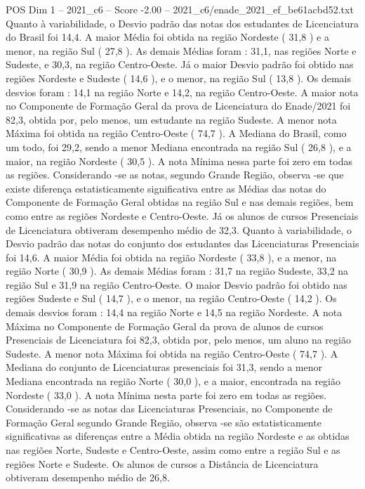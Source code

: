 \begin{textsample}{POS Dim 1 – 2021\_c6 – Score -2.00 – 2021\_c6/enade\_2021\_ef\_be61acbd52.txt}
Quanto à variabilidade, o Desvio padrão das notas dos estudantes de Licenciatura do Brasil foi 14,4.
A maior Média foi obtida na região Nordeste ( 31,8 ) e a menor, na região Sul ( 27,8 ).
As demais Médias foram : 31,1, nas regiões Norte e Sudeste, e 30,3, na região Centro-Oeste.
Já o maior Desvio padrão foi obtido nas regiões Nordeste e Sudeste ( 14,6 ), e o menor, na região Sul ( 13,8 ).
Os demais desvios foram : 14,1 na região Norte e 14,2, na região Centro-Oeste.
A maior nota no Componente de Formação Geral da prova de Licenciatura do Enade/2021 foi 82,3, obtida por, pelo menos, um estudante na região Sudeste.
A menor nota Máxima foi obtida na região Centro-Oeste ( 74,7 ).
A Mediana do Brasil, como um todo, foi 29,2, sendo a menor Mediana encontrada na região Sul ( 26,8 ), e a maior, na região Nordeste ( 30,5 ).
A nota Mínima nessa parte foi zero em todas as regiões.
Considerando -se as notas, segundo Grande Região, observa -se que existe diferença estatisticamente significativa entre as Médias das notas do Componente de Formação Geral obtidas na região Sul e nas demais regiões, bem como entre as regiões Nordeste e Centro-Oeste.
Já os alunos de cursos Presenciais de Licenciatura obtiveram desempenho médio de 32,3.
Quanto à variabilidade, o Desvio padrão das notas do conjunto dos estudantes das Licenciaturas Presenciais foi 14,6.
A maior Média foi obtida na região Nordeste ( 33,8 ), e a menor, na região Norte ( 30,9 ).
As demais Médias foram : 31,7 na região Sudeste, 33,2 na região Sul e 31,9 na região Centro-Oeste.
O maior Desvio padrão foi obtido nas regiões Sudeste e Sul ( 14,7 ), e o menor, na região Centro-Oeste ( 14,2 ).
Os demais desvios foram : 14,4 na região Norte e 14,5 na região Nordeste.
A nota Máxima no Componente de Formação Geral da prova de alunos de cursos Presenciais de Licenciatura foi 82,3, obtida por, pelo menos, um aluno na região Sudeste.
A menor nota Máxima foi obtida na região Centro-Oeste ( 74,7 ).
A Mediana do conjunto de Licenciaturas presenciais foi 31,3, sendo a menor Mediana encontrada na região Norte ( 30,0 ), e a maior, encontrada na região Nordeste ( 33,0 ).
A nota Mínima nesta parte foi zero em todas as regiões.
Considerando -se as notas das Licenciaturas Presenciais, no Componente de Formação Geral segundo Grande Região, observa -se são estatisticamente significativas as diferenças entre a Média obtida na região Nordeste e as obtidas nas regiões Norte, Sudeste e Centro-Oeste, assim como entre a região Sul e as regiões Norte e Sudeste.
Os alunos de cursos a Distância de Licenciatura obtiveram desempenho médio de 26,8.

\end{textsample}
